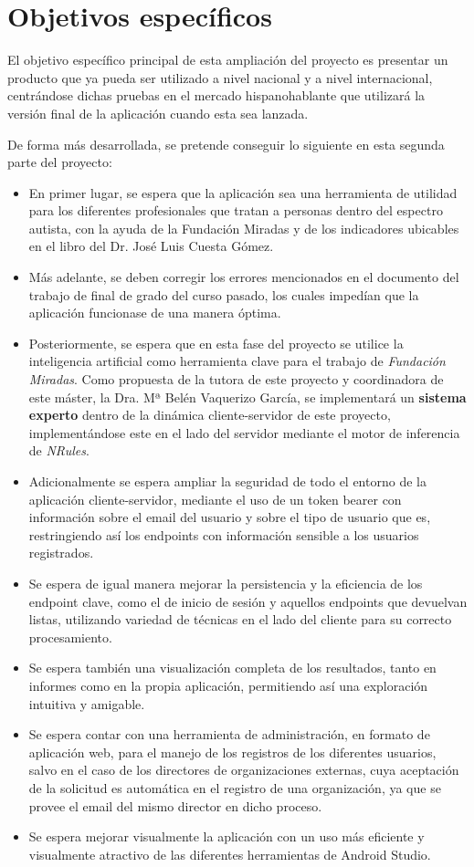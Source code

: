 \section{Objetivos específicos}
El objetivo específico principal de esta ampliación del proyecto es presentar un
producto que ya pueda ser utilizado a nivel nacional y a nivel
internacional, centrándose dichas pruebas en el mercado hispanohablante que
utilizará la versión final de la aplicación cuando esta sea lanzada.

De forma más desarrollada, se pretende conseguir lo siguiente en esta segunda parte del proyecto:
\begin{itemize}
    \item En primer lugar, se espera que la aplicación sea una herramienta de
    utilidad para los diferentes profesionales que tratan a personas dentro del
    espectro autista, con la ayuda de la Fundación Miradas y de los indicadores
    ubicables en el libro del Dr. José Luis Cuesta Gómez.
    \item Más adelante, se deben corregir los errores mencionados en el
    documento del trabajo de final de grado del curso pasado, los cuales
    impedían que la aplicación funcionase de una manera óptima.
    \item Posteriormente, se espera que en esta fase del proyecto se utilice la
    inteligencia artificial como herramienta clave para el trabajo de
    \textit{Fundación Miradas}. Como propuesta de la tutora de este proyecto y
    coordinadora de este máster, la Dra. Mª Belén Vaquerizo García, se
    implementará un \textbf{sistema experto} dentro de la dinámica
    cliente-servidor de este proyecto, implementándose este en el lado del
    servidor mediante el motor de inferencia de \textit{NRules}.
    \item Adicionalmente se espera ampliar la seguridad de todo el entorno de la
    aplicación cliente-servidor, mediante el uso de un token bearer con información sobre el
    email del usuario y sobre el tipo de usuario que es, restringiendo así los
    endpoints con información sensible a los usuarios registrados.
    \item Se espera de igual manera mejorar la persistencia y la eficiencia de
    los endpoint clave, como el de inicio de sesión y aquellos endpoints que
    devuelvan listas, utilizando variedad de técnicas en el lado del cliente para su correcto procesamiento.
    \item Se espera también una visualización completa de los resultados, tanto
    en informes como en la propia aplicación, permitiendo así una exploración intuitiva y amigable.
    \item Se espera contar con una herramienta de administración, en formato de
    aplicación web, para el manejo de los registros de los diferentes usuarios,
    salvo en el caso de los directores de organizaciones externas, cuya
    aceptación de la solicitud es automática en el registro de una organización,
    ya que se provee el email del mismo director en dicho proceso.
    \item Se espera mejorar visualmente la aplicación con un uso más eficiente y
    visualmente atractivo de las diferentes herramientas de Android Studio.
\end{itemize}